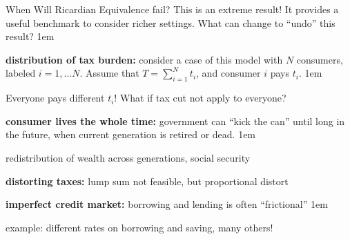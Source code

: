 \documentclass[11pt,aspectratio=43,usenames,dvipsnames]{beamer}
\let\olditemize=\itemize
\let\endolditemize=\enditemize
\renewenvironment{itemize}{\olditemize \itemsep1em}{\endolditemize}
\let\oldenumerate=\enumerate
\let\endoldenumerate=\endenumerate
\renewenvironment{enumerate}{\oldenumerate \itemsep1em}{ \endoldenumerate}
\theoremstyle{definition}
\begin{document}
\begin{frame}{When Will Ricardian Equivalence fail?}
\label{slide:When_Will_Ricardian_Equivalence_fail_}
    This is an extreme result! It provides a useful \alert{benchmark} to consider richer settings. What can change to ``undo'' this result?
    \begin{enumerate}
        \item \textbf{distribution of tax burden:} consider a case of this model with $ N $ consumers, labeled $ i = 1, \ldots N$. Assume that $ T = \sum_{i=1}^{N} t_{i} $, and consumer $ i $ pays $ t_{i} $.
        \begin{itemize}
            \item Everyone pays different $ t_{i} $! What if tax cut not apply to everyone?
        \end{itemize}
        \item \textbf{consumer lives the whole time:} government can ``kick the can'' until long in the future, when current generation is retired or dead.
        \begin{itemize}
            \item redistribution of wealth across generations, social security
        \end{itemize}
        \item \textbf{distorting taxes:} lump sum not feasible, but proportional distort
        \item \textbf{imperfect credit market:} borrowing and lending is often ``\alert{frictional}''
        \begin{itemize}
            \item example: different rates on borrowing and saving, many others!
        \end{itemize}
    \end{enumerate}
\end{frame}
\end{document}
